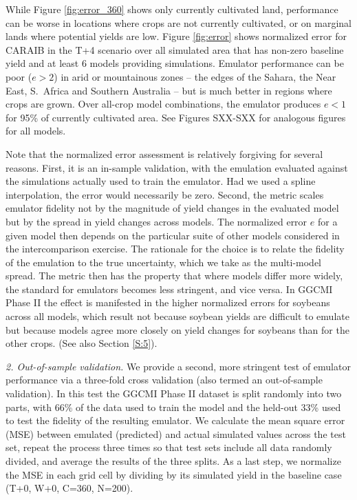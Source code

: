 \documentclass[gmd, manuscript]{copernicus} %
\begin{document}
While Figure \ref{fig:error_360} shows only currently cultivated land, performance can be worse in locations where crops are not currently cultivated, or on marginal lands where potential yields are low. 
Figure \ref{fig:error} shows normalized error for CARAIB in the T+4 scenario over all simulated area that has non-zero baseline yield and at least 6 models providing simulations.  
Emulator performance can be poor ($e > 2$) in arid or mountainous zones -- the edges of the Sahara, the Near East, S.\ Africa and Southern Australia -- but is much better in regions where crops are grown. 
Over all-crop model combinations, the emulator produces $e < 1$ for 95\% of currently cultivated area.
See Figures SXX-SXX for analogous figures for all models.

Note that the normalized error assessment is relatively forgiving for several reasons. 
First, it is an in-sample validation, with the emulation evaluated against the simulations actually used to train the emulator. 
Had we used a spline interpolation, the error would necessarily be zero. 
Second, the metric scales emulator fidelity not by the magnitude of yield changes in the evaluated model but by the spread in yield changes across models. 
The normalized error $e$ for a given model then depends on the particular suite of other models considered in the intercomparison exercise.  
The rationale for the choice is to relate the fidelity of the emulation to the true uncertainty, which we take as the multi-model spread. 
The metric then has the property that where models differ more widely, the standard for emulators becomes less stringent, and vice versa.
In GGCMI Phase II the effect is manifested in the higher normalized errors for soybeans across all models, which result not because soybean yields are difficult to emulate but because models agree more closely on yield changes for soybeans than for the other crops. (See also Section \ref{S:5}).


\textit{2. Out-of-sample validation.} We provide a second, more stringent test of emulator performance via a three-fold cross validation (also termed an out-of-sample validation). 
In this test the GGCMI Phase II dataset is split randomly into two parts, with 66\% of the data used to train the model and the held-out 33\% used to test the fidelity of the resulting emulator.
We calculate the mean square error (MSE) between emulated (predicted) and actual simulated values across the test set, repeat the process three times so that test sets include all data randomly divided, and average the results of the three splits. 
As a last step, we normalize the MSE in each grid cell by dividing by its simulated yield in the baseline case (T+0, W+0, C=360, N=200). 
\end{document}

